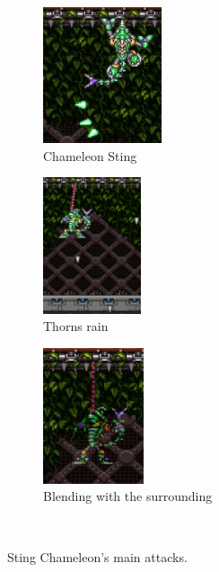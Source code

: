 \begin{figure}
\ContinuedFloat
\centering
	\begin{subfigure}[t]{0.3\linewidth}
		\centering
		\includegraphics[height=4cm]{figures/X1/Sting_chameleon/Chameleon_sting.jpg}
		\caption{Chameleon Sting}
	\end{subfigure}
	\begin{subfigure}[t]{0.3\linewidth}
		\centering
		\includegraphics[height=4cm]{figures/X1/Sting_chameleon/Chameleon_spike_fall.jpg}
		\caption{Thorns rain}
	\end{subfigure}
	\begin{subfigure}[t]{0.3\linewidth}
		\centering
		\includegraphics[height=4cm]{figures/X1/Sting_chameleon/Chameleon_blend.jpg}
		\caption{Blending with the surrounding}
	\end{subfigure}\\
	\caption{Sting Chameleon's main attacks.}
\end{figure} 
